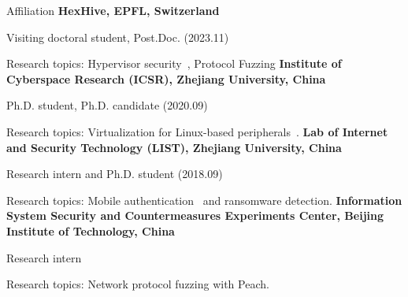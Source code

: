\begin{rubric}{Affiliation}
\entry*[2023.02 -- 202x.xx]
	\textbf{HexHive, EPFL, Switzerland}
	\par Visiting doctoral student, Post.Doc. (2023.11)
	\par Research topics: Hypervisor security~\cite{videzzo@2023,alxdr2024hyperpill}, Protocol Fuzzing
\entry*[2019.05 -- 2023.09]
	\textbf{Institute of Cyberspace Research (ICSR), Zhejiang University, China}
	\par Ph.D. student, Ph.D. candidate (2020.09)
	\par Research topics: Virtualization for Linux-based peripherals~\cite{liu2021firmguide,jiang2021ecmo,videzzo@2023}.
\entry*[2017.07 -- 2019.04]
    \textbf{Lab of Internet and Security Technology (LIST), Zhejiang University, China}
	\par Research intern and Ph.D. student (2018.09)
	\par Research topics: Mobile authentication~\cite{espialcog@2020,onecycleattack@2021,trapcog@2023} and ransomware detection.
\entry*[2016.09 -- 2017.06]
	\textbf{Information System Security and Countermeasures Experiments Center,
	Beijing Institute of Technology, China} 
	\par Research intern
	\par Research topics: Network protocol fuzzing with Peach.
\end{rubric}